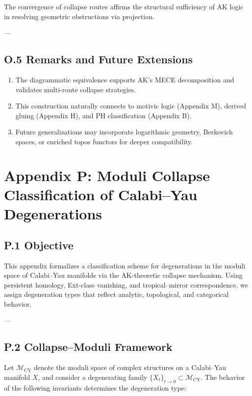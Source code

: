\documentclass[11pt]{article}
\begin{document}
\begin{axiom}
\begin{axiom}
{{The convergence of collapse routes affirms the structural sufficiency of AK logic in resolving geometric obstructions via projection.

---

\subsection*{O.5 Remarks and Future Extensions}

\begin{enumerate}
  \item The diagrammatic equivalence supports AK’s MECE decomposition and validates multi-route collapse strategies.
  \item This construction naturally connects to motivic logic (Appendix M), derived gluing (Appendix H), and PH classification (Appendix B).
  \item Future generalizations may incorporate logarithmic geometry, Berkovich spaces, or enriched topos functors for deeper compatibility.
\end{enumerate}


\section*{Appendix P: Moduli Collapse Classification of Calabi–Yau Degenerations}

\subsection*{P.1 Objective}

This appendix formalizes a classification scheme for degenerations in the moduli space of Calabi–Yau manifolds  
via the AK-theoretic collapse mechanism. Using persistent homology, Ext-class vanishing, and tropical–mirror correspondence,  
we assign degeneration types that reflect analytic, topological, and categorical behavior.

---

\subsection*{P.2 Collapse–Moduli Framework}

Let \( \mathcal{M}_{\mathrm{CY}} \) denote the moduli space of complex structures on a Calabi–Yau manifold \( X \),  
and consider a degenerating family \( \{X_t\}_{t \to 0} \subset \mathcal{M}_{\mathrm{CY}} \). The behavior of the following invariants determines the degeneration type:

}}
\end{axiom}
\end{axiom}
\end{document}
